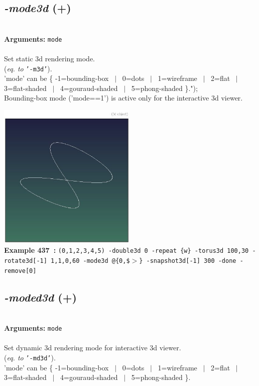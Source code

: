 \documentclass[a4paper,11pt,twoside]{book}
\begin{document}
\subsection{\emph{-mode3d} (+)}\vspace*{-0.5em}
~\\\textbf{Arguments: } 
{\small \texttt{mode}}\\~\\
Set static 3d rendering mode.
~\\(\emph{eq. to} {\small \texttt{'-m3d'}}).
~\\'mode' can be \{ -1=bounding-box ~$|$~ 0=dots ~$|$~ 1=wireframe ~$|$~ 2=flat ~$|$~ 3=flat-shaded ~$|$~ 4=gouraud-shaded ~$|$~ 5=phong-shaded \}.");
~\\Bounding-box mode ('mode==1') is active only for the interactive 3d viewer.
\begin{center}\includegraphics[keepaspectratio=true,height=7cm,width=\textwidth]{img/gmic_def437.jpg}\\
{\footnotesize \textbf{Example 437~:} \texttt{(0,1,2,3,4,5) -double3d 0 -repeat \{w\} -torus3d 100,30 -rotate3d[-1] 1,1,0,60 -mode3d @\{0,\$$>$\} -snapshot3d[-1] 300 -done -remove[0]}}
\end{center}

\subsection{\emph{-moded3d} (+)}\vspace*{-0.5em}
~\\\textbf{Arguments: } 
{\small \texttt{mode}}\\~\\
Set dynamic 3d rendering mode for interactive 3d viewer.
~\\(\emph{eq. to} {\small \texttt{'-md3d'}}).
~\\'mode' can be \{ -1=bounding-box ~$|$~ 0=dots ~$|$~ 1=wireframe ~$|$~ 2=flat ~$|$~ 3=flat-shaded ~$|$~ 4=gouraud-shaded ~$|$~ 5=phong-shaded \}.
\end{document}
